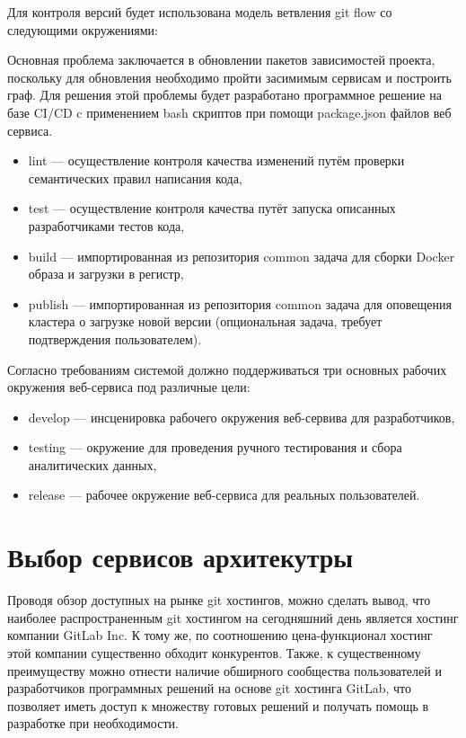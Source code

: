 Для контроля версий будет использована модель ветвления git flow со следующими окружениями:

Основная проблема заключается в обновлении пакетов зависимостей проекта, поскольку для обновления необходимо пройти засимимым сервисам и построить граф.
Для решения этой проблемы будет разработано программное решение на базе CI/CD c применением bash скриптов при помощи package.json файлов веб сервиса.

\begin{itemize}
    \item lint --- осуществление контроля качества изменений путём проверки семантических правил написания кода,
    \item test --- осуществление контроля качества путёт запуска описанных разработчиками тестов кода,
    \item build --- импортированная из репозитория common задача для сборки Docker образа и загрузки в регистр,
    \item publish --- импортированная из репозитория common задача для оповещения кластера о загрузке новой версии (опциональная задача, требует подтверждения пользователем).
\end{itemize}

Согласно требованиям системой должно поддерживаться три основных рабочих окружения веб-сервиса под различные цели:

\begin{itemize}
    \item develop --- инсценировка рабочего окружения веб-сервива для разработчиков,
    \item testing --- окружение для проведения ручного тестирования и сбора аналитических данных,
    \item release --- рабочее окружение веб-сервиса для реальных пользователей.
\end{itemize}

\section{Выбор сервисов архитекутры}

Проводя обзор доступных на рынке git хостингов, можно сделать вывод, что наиболее распространенным git хостингом на сегодняшний день является хостинг компании GitLab Inc.
К тому же, по соотношению цена-функционал хостинг этой компании существенно обходит конкурентов.
Также, к существенному преимуществу можно отнести наличие обширного сообщества пользователей и разработчиков программных решений на основе git хостинга GitLab,
что позволяет иметь доступ к множеству готовых решений и получать помощь в разработке при необходимости.

